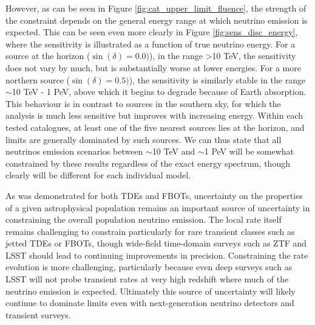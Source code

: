 However, as can be seen in Figure \ref{fig:cat_upper_limit_fluence}, the strength of the constraint depends on the general energy range at which neutrino emission is expected. This can be seen even more clearly in Figure \ref{fig:sens_disc_energy}, where the sensitivity is illustrated as a function of true neutrino energy. For a source at the horizon ($\sin(\delta)=0.0)$), in the range >10 TeV, the sensitivity does not vary by much, but is substantially worse at lower energies. For a more northern source ($\sin(\delta)=0.5)$), the sensitivity is similarly stable in the range $\sim$10 TeV - 1 PeV, above which it begins to degrade because of Earth absorption. This behaviour is in contrast to sources in the southern sky, for which the analysis is much less sensitive but improves with increasing energy. Within each tested catalogues, at least one of the five nearest sources lies at the horizon, and limits are generally dominated by such sources. We can thus state that all neutrinos emission scenarios between $\sim$10 TeV  and $\sim$1 PeV will be somewhat constrained by these results regardless of the exact energy spectrum, though clearly will be different for each individual model.

As was demonstrated for both TDEs and FBOTs, uncertainty on the properties of a given astrophysical population remains an important source of uncertainty in constraining the overall population neutrino emission. The local rate itself remains challenging to constrain particularly for rare transient classes such as jetted TDEs or FBOTs, though wide-field time-domain surveys such as ZTF and LSST should lead to continuing improvements in precision. Constraining the rate evolution is more challenging, particularly because even deep surveys such as LSST will not probe transient rates at very high redshift where much of the neutrino emission is expected. Ultimately this source of uncertainty will likely continue to dominate limits even with next-generation neutrino detectors and transient surveys.